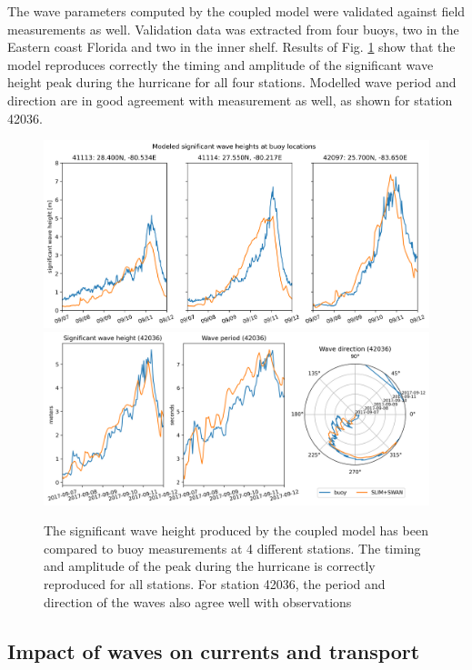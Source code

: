 \documentclass[11pt,a4paper]{article}
\begin{document}
The wave parameters computed by the coupled model were validated against field measurements as well. Validation data was extracted from four buoys, two in the Eastern coast Florida and two in the inner shelf. Results of Fig. \ref{fig:waves} show that the model reproduces correctly the timing and amplitude of the significant wave height peak during the hurricane for all four stations. Modelled wave period and direction are in good agreement with measurement as well, as shown for station 42036. 

\begin{figure}
    \centering
    \includegraphics[width=.95\textwidth]{fig/hsig_with_map_ww3.png}
    \includegraphics[width=.95\textwidth]{fig/waves_ww3_5km-00002.png}
    \caption{The significant wave height produced by the coupled model has been compared to buoy measurements at 4 different stations. The timing and amplitude of the peak during the hurricane is correctly reproduced for all stations. For station 42036, the period and direction of the waves also agree well with observations}
    \label{fig:waves}
\end{figure}

\subsection{Impact of waves on currents and transport}
\end{document}
